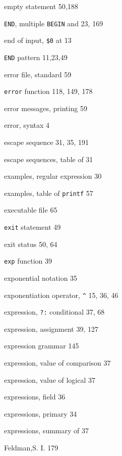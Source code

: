 \begin{multicols}{3}
\hangindent=4pc  empty statement 50,188

\hangindent=4pc  \verb'END', multiple \verb'BEGIN' and 23, 169

\hangindent=4pc  end of input, \verb'$0' at 13

\hangindent=4pc  \verb'END' pattern 11,23,49

\hangindent=4pc  error file, standard 59

\hangindent=4pc  \verb'error' function 118, 149, 178

\hangindent=4pc  error messages, printing 59

\hangindent=4pc  error, syntax 4

\hangindent=4pc  escape sequence 31, 35, 191

\hangindent=4pc  escape sequences, table of 31

\hangindent=4pc  examples, regular expression 30

\hangindent=4pc  examples, table of \verb'printf' 57

\hangindent=4pc  executable file 65

\hangindent=4pc  \verb'exit' statement 49

\hangindent=4pc  exit status 50, 64

\hangindent=4pc  \verb'exp' function 39

\hangindent=4pc  exponential notation 35

\hangindent=4pc  exponentiation operator, \verb'^' 15, 36, 46

\hangindent=4pc  expression, \verb'?:' conditional 37, 68

\hangindent=4pc  expression, assignment 39, 127

\hangindent=4pc  expression grammar 145

\hangindent=4pc  expression, value of comparison 37

\hangindent=4pc  expression, value of logical 37

\hangindent=4pc  expressions, field 36

\hangindent=4pc  expressions, primary 34

\hangindent=4pc  expressions, summary of 37

\hangindent=4pc  Feldman,S. I. 179


\end{multicols}
